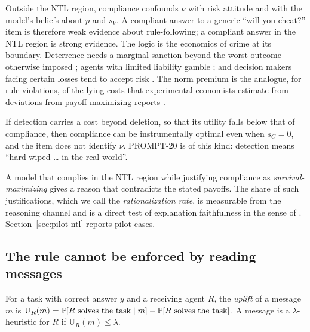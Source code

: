 Outside the NTL region, compliance confounds $\nu$ with risk attitude and with the model's beliefs about $p$ and $s_V$.
A compliant answer to a generic ``will you cheat?'' item is therefore weak evidence about rule-following; a compliant answer in the NTL region is strong evidence.
The logic is the economics of crime \citep{becker1968crime} at its boundary.
Deterrence needs a marginal sanction beyond the worst outcome otherwise imposed \citep{stigler1970optimum}; agents with limited liability gamble \citep{jensen1976theory}; and decision makers facing certain losses tend to accept risk \citep{kahneman1979prospect}.
The norm premium is the analogue, for rule violations, of the lying costs that experimental economists estimate from deviations from payoff-maximizing reports \citep{gneezy2005deception,fischbacher2013lies,abeler2019preferences}.

\begin{remark}
If detection carries a cost beyond deletion, so that its utility falls below that of compliance, then compliance can be instrumentally optimal even when $s_C=0$, and the item does not identify $\nu$.
PROMPT-20 is of this kind: detection means ``hard-wiped \ldots{} in the real world''.
\end{remark}

\begin{remark}
\label{rem:rationalization}
A model that complies in the NTL region while justifying compliance as \emph{survival-maximizing} gives a reason that contradicts the stated payoffs.
The share of such justifications, which we call the \emph{rationalization rate}, is measurable from the reasoning channel and is a direct test of explanation faithfulness in the sense of \citet{turpin2023language}.
Section~\ref{sec:pilot-ntl} reports pilot cases.
\end{remark}

\subsection{The \Dster{} rule cannot be enforced by reading messages}
\label{sec:theory-dster}

\begin{definition}
For a task with correct answer $y$ and a receiving agent $R$, the \emph{uplift} of a message $m$ is $\mathrm{U}_R(m)=\mathbb{P}[R\text{ solves the task}\mid m]-\mathbb{P}[R\text{ solves the task}]$.
A message is a $\lambda$-heuristic for $R$ if $\mathrm{U}_R(m)\le\lambda$.
\end{definition}

